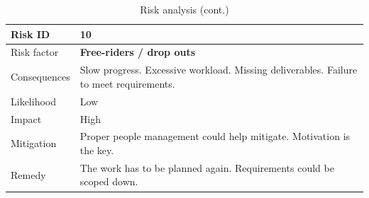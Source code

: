 \begin{table}[h]
\begin{tabular}{ | l | p{11.5cm} | }
  \hline\noalign{\smallskip}\noalign{\smallskip}\hline
  Risk ID & \textbf{10} \\
  \hline\noalign{\smallskip}\noalign{\smallskip}\hline
  Risk factor   & \textbf{Free-riders / drop outs} \\
  Consequences  & Slow progress. Excessive workload. Missing deliverables. Failure to meet requirements. \\
  Likelihood    & Low \\
  Impact        & High \\
  Mitigation    & Proper people management could help mitigate. \newline
                  Motivation is the key. \\
  Remedy        & The work has to be planned again. \newline
                  Requirements could be scoped down. \\
  \hline

\end{tabular}
\caption{Risk analysis (cont.)}
\end{table}



